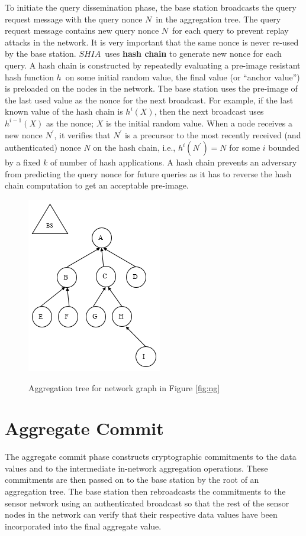 		To initiate the query dissemination phase, the base station broadcasts the query request message with the query nonce $N$\ in the aggregation tree. 
		The query request message contains new query nonce $N$\ for each query to prevent replay attacks in the network.
		It is very important that the same nonce is never re-used by the base station.
		$SHIA$\ uses \textbf{hash chain} to generate new nonce for each query. 
		A hash chain is constructed by repeatedly evaluating a pre-image resistant hash function $h$\ on some initial random value, the final value (or ``anchor value'') is preloaded on the nodes in the network.
		The base station uses the pre-image of the last used  value as the nonce for the next broadcast.
		For example, if the last known value of the hash chain is $h^i(X)$, then the next broadcast uses $h^{i-1}(X)$ as the nonce; $X$ is the initial random value.
		When a node receives a new nonce $N^{'}$, it verifies that $N^{'}$ is a precursor to the most recently received (and authenticated) nonce $N$ on the hash chain, i.e., $h^{i}(N^{'}) = N$ for some $i$ bounded by a fixed $k$ of number of hash applications.  
		A hash chain prevents an adversary from predicting the query nonce for future queries as it has to reverse the hash chain computation to get an acceptable pre-image.
		\begin{figure}[h!]
			\centering
			\includegraphics[scale = 1]{images/aggregation-tree.png}\\
			\caption{Aggregation tree for network graph in Figure \ref{fig:ng}}
			\label{fig:at}
		\end{figure}		

\section{Aggregate Commit} 
		\label{sub:aggregate_commit}
		The aggregate commit phase constructs cryptographic commitments to the data values and to the intermediate in-network aggregation operations.
		These commitments are then passed on to the base station by the root of an aggregation tree.
		The base station then rebroadcasts the commitments to the sensor network using an authenticated broadcast so that the rest of the sensor nodes in the network can verify that their respective data values have been incorporated into the final aggregate value.

